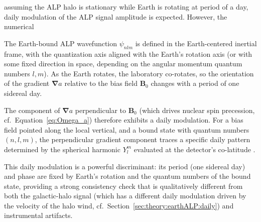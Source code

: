  assuming the ALP halo is stationary while Earth is rotating at period of a day, daily modulation of the ALP signal amplitude is expected. 
However, the numerical 



The Earth-bound ALP wavefunction $\psi_{nlm}$ is defined in the Earth-centered inertial frame, with the quantization axis aligned with the Earth's rotation axis (or with some fixed direction in space, depending on the angular momentum quantum numbers $l,m$). As the Earth rotates, the laboratory co-rotates, so the orientation of the gradient $\boldsymbol{\nabla}a$ relative to the bias field $\mathbf{B}_0$ changes with a period of one sidereal day.

The component of $\boldsymbol{\nabla}a$ perpendicular to $\mathbf{B}_0$ (which drives nuclear spin precession, cf.\ Equation~\eqref{eq:Omega_a}) therefore exhibits a daily modulation. For a bias field pointed along the local vertical, and a bound state with quantum numbers $(n, l, m)$, the perpendicular gradient component traces a specific daily pattern determined by the spherical harmonic $Y_l^m$ evaluated at the detector's co-latitude .

This daily modulation is a powerful discriminant: its period (one sidereal day) and phase are fixed by Earth's rotation and the quantum numbers of the bound state, providing a strong consistency check that is qualitatively different from both the galactic-halo signal (which has a different daily modulation driven by the velocity of the halo wind, cf.\ Section~\ref{sec:theory:earthALP:daily}) and instrumental artifacts. 
